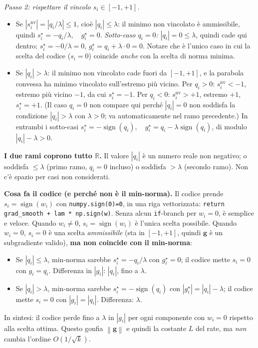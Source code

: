 \documentclass[11pt,a4paper]{article}
\newcommand{\R}{\mathbb{R}}
\newcommand{\norm}[1]{\left\|#1\right\|}
\newcommand{\bg}{\mathbf{g}}
\theoremstyle{definition}
\begin{document}
\begin{tcolorbox}[warning]
\emph{Passo 2: rispettare il vincolo $s_i\in[-1,+1]$.}
\begin{itemize}[leftmargin=*]
\item Se $|s_i^{\text{nv}}|=|q_i/\lambda|\le 1$, cioè $|q_i|\le\lambda$: il minimo non vincolato è ammissibile, quindi $\boxed{s_i^\star = -q_i/\lambda,\quad g_i^\star = 0}$. \emph{Sotto-caso $q_i = 0$:} $|q_i| = 0 \le \lambda$, quindi cade qui dentro; $s_i^\star = -0/\lambda = 0$, $g_i^\star = q_i + \lambda\cdot 0 = 0$. Notare che è l'unico caso in cui la scelta del codice ($s_i = 0$) coincide \emph{anche} con la scelta di norma minima.
\item Se $|q_i| > \lambda$: il minimo non vincolato cade fuori da $[-1,+1]$, e la parabola convessa ha minimo vincolato sull'estremo più vicino. Per $q_i > 0$: $s_i^{\text{nv}} < -1$, estremo più vicino $-1$, da cui $s_i^\star = -1$. Per $q_i < 0$: $s_i^{\text{nv}} > +1$, estremo $+1$, $s_i^\star = +1$. (Il caso $q_i = 0$ non compare qui perché $|q_i|=0$ non soddisfa la condizione $|q_i|>\lambda$ con $\lambda>0$; va automaticamente nel ramo precedente.) In entrambi i sotto-casi $\boxed{s_i^\star = -\operatorname{sign}(q_i),\quad g_i^\star = q_i - \lambda\operatorname{sign}(q_i)}$, di modulo $|q_i|-\lambda > 0$.
\end{itemize}
\textbf{I due rami coprono tutto $\R$.} Il valore $|q_i|$ è un numero reale non negativo; o soddisfa $\le \lambda$ (primo ramo, $q_i = 0$ incluso) o soddisfa $> \lambda$ (secondo ramo). Non c'è spazio per casi non considerati.

\smallskip
\textbf{Cosa fa il codice (e perché non è il min-norma).} Il codice prende $s_i = \operatorname{sign}(w_i)$ con \texttt{numpy.sign(0)=0}, in una riga vettorizzata: \texttt{return grad\_smooth + lam * np.sign(w)}. Senza alcun \texttt{if}-branch per $w_i = 0$, è semplice e veloce. Quando $w_i\ne 0$, $s_i = \operatorname{sign}(w_i)$ è l'unica scelta possibile. Quando $w_i = 0$, $s_i = 0$ è una scelta \emph{ammissibile} (sta in $[-1,+1]$, quindi $\bg$ è un subgradiente valido), \textbf{ma non coincide con il min-norma}:
\begin{itemize}[leftmargin=*]
\item Se $|q_i|\le\lambda$, min-norma sarebbe $s_i^\star = -q_i/\lambda$ con $g_i^\star = 0$; il codice mette $s_i = 0$ con $g_i = q_i$. Differenza in $|g_i|$: $|q_i|$, fino a $\lambda$.
\item Se $|q_i|>\lambda$, min-norma sarebbe $s_i^\star = -\operatorname{sign}(q_i)$ con $|g_i^\star| = |q_i|-\lambda$; il codice mette $s_i = 0$ con $|g_i| = |q_i|$. Differenza: $\lambda$.
\end{itemize}
In sintesi: il codice perde fino a $\lambda$ in $|g_i|$ per ogni componente con $w_i = 0$ rispetto alla scelta ottima. Questo gonfia $\norm{\bg}$ e quindi la costante $L$ del rate, ma \emph{non} cambia l'ordine $O(1/\sqrt k)$.


\end{tcolorbox}
\end{document}

